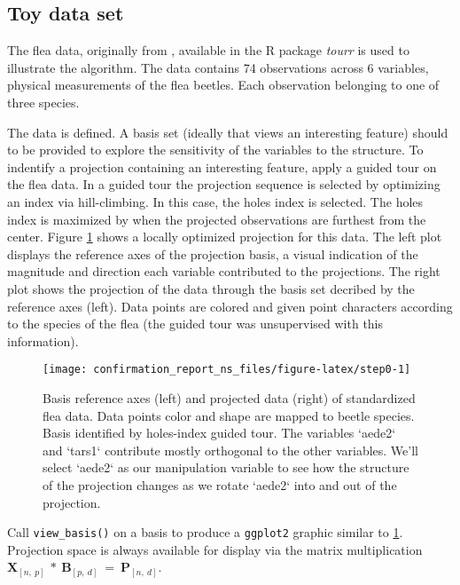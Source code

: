 \documentclass{monashthesis}
\begin{document}
\subsection{Toy data set}\label{toy-data-set}

The flea data, originally from \textcite{lubischew_use_1962}, available
in the R package \emph{tourr} \autocite{wickham_tourr_2011} is used to
illustrate the algorithm. The data contains 74 observations across 6
variables, physical measurements of the flea beetles. Each observation
belonging to one of three species.

The data is defined. A basis set (ideally that views an interesting
feature) should to be provided to explore the sensitivity of the
variables to the structure. To indentify a projection containing an
interesting feature, apply a guided tour\autocite{cook_interactive_2007}
on the flea data. In a guided tour the projection sequence is selected
by optimizing an index via hill-climbing. In this case, the holes index
is selected. The holes index is maximized by when the projected
observations are furthest from the center. Figure \ref{fig:step0} shows
a locally optimized projection for this data. The left plot displays the
reference axes of the projection basis, a visual indication of the
magnitude and direction each variable contributed to the projections.
The right plot shows the projection of the data through the basis set
decribed by the reference axes (left). Data points are colored and given
point characters according to the species of the flea (the guided tour
was unsupervised with this information).

\begin{figure}

{\centering \texttt{[image: confirmation\_report\_ns\_files/figure-latex/step0-1]} 

}

\caption{Basis reference axes (left) and projected data (right) of standardized flea data. Data points color and shape are mapped to beetle species. Basis identified by holes-index guided tour. The variables `aede2` and `tars1` contribute mostly orthogonal to the other variables. We'll select `aede2` as our manipulation variable to see how the structure of the projection changes as we rotate `aede2` into and out of the projection.}\label{fig:step0}
\end{figure}

Call \texttt{view\_basis()} on a basis to produce a \texttt{ggplot2}
graphic similar to \ref{fig:step0}. Projection space is always available
for display via the matrix multiplication
\(\textbf{X}_{[n,~p]} ~*~ \textbf{B}_{[p,~d]} ~=~ \textbf{P}_{[n,~d]}\).
\end{document}

